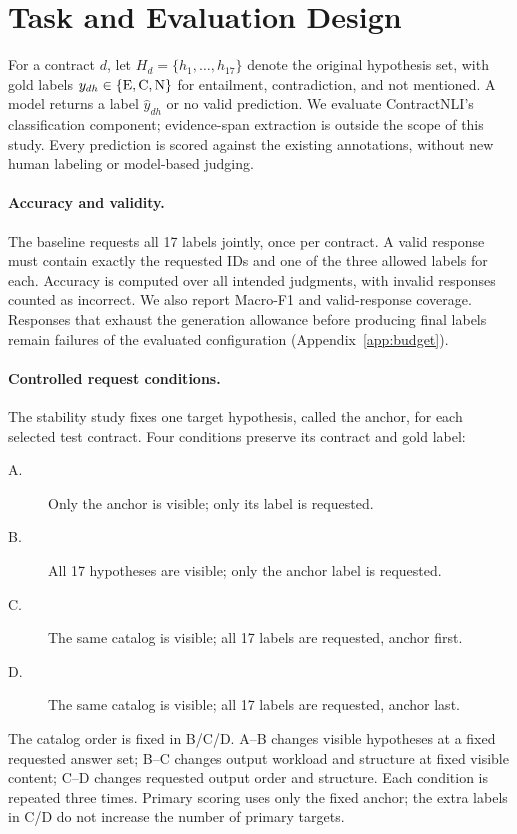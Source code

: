 \documentclass{article}
\begin{document}
\section{Task and Evaluation Design}
\label{sec:task}
For a contract $d$, let $H_d=\{h_1,\ldots,h_{17}\}$ denote the original hypothesis set, with gold labels $y_{dh}\in\{\mathrm{E},\mathrm{C},\mathrm{N}\}$ for entailment, contradiction, and not mentioned. A model returns a label $\hat y_{dh}$ or no valid prediction. We evaluate ContractNLI's classification component; evidence-span extraction is outside the scope of this study. Every prediction is scored against the existing annotations, without new human labeling or model-based judging.

\paragraph{Accuracy and validity.}
The baseline requests all 17 labels jointly, once per contract. A valid response must contain exactly the requested IDs and one of the three allowed labels for each. Accuracy is computed over all intended judgments, with invalid responses counted as incorrect. We also report Macro-F1 and valid-response coverage. Responses that exhaust the generation allowance before producing final labels remain failures of the evaluated configuration (Appendix~\ref{app:budget}).

\paragraph{Controlled request conditions.}
The stability study fixes one target hypothesis, called the anchor, for each selected test contract. Four conditions preserve its contract and gold label:
\begin{description}
\item[A.] Only the anchor is visible; only its label is requested.
\item[B.] All 17 hypotheses are visible; only the anchor label is requested.
\item[C.] The same catalog is visible; all 17 labels are requested, anchor first.
\item[D.] The same catalog is visible; all 17 labels are requested, anchor last.
\end{description}
The catalog order is fixed in B/C/D. A--B changes visible hypotheses at a fixed requested answer set; B--C changes output workload and structure at fixed visible content; C--D changes requested output order and structure. Each condition is repeated three times. Primary scoring uses only the fixed anchor; the extra labels in C/D do not increase the number of primary targets.
\end{document}
